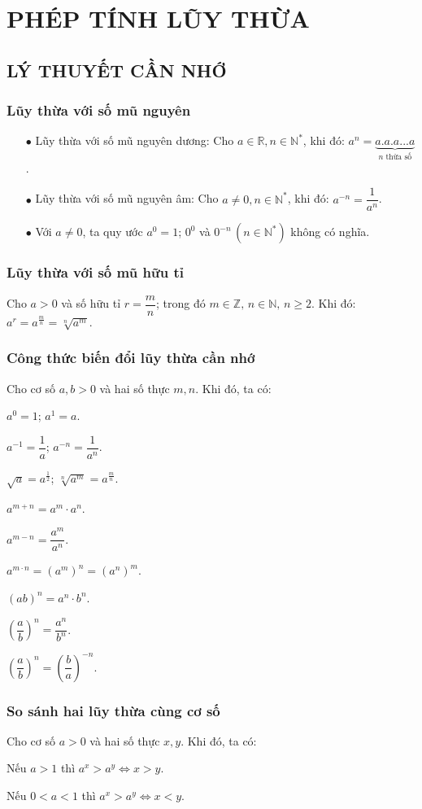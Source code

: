 \section{PHÉP TÍNH LŨY THỪA}
\subsection{LÝ THUYẾT CẦN NHỚ}
\subsubsection{Lũy thừa với số mũ nguyên}
	\begin{itemize}
		\item [$\bullet$] Lũy thừa với số mũ nguyên dương: Cho $a\in \mathbb{R}, n\in {\mathbb{N}}^{*}$, khi đó: $a^n=\underbrace{a.a.a...a}_{n \text{ thừa số}}$.
		\item [$\bullet$] Lũy thừa với số mũ nguyên âm: Cho $a \ne 0, n\in {\mathbb{N}}^{*}$, khi đó: $a^{-n}=\dfrac{1}{a^n}$.
		\item [$\bullet$] Với $a \ne 0$, ta quy ước $a^0=1$; \quad $0^0$ và $0^{-n}\, (n \in \mathbb{N}^{*})$ không có nghĩa.
	\end{itemize}

\subsubsection{Lũy thừa với số mũ hữu tỉ}
	Cho $a>0$ và số hữu tỉ $r=\dfrac{m}{n}$; trong đó $m\in \mathbb{Z},\,n\in \mathbb{N},\,n\ge 2$. Khi đó: $a^r={a}^{\tfrac{m}{n}}=\sqrt[n]{a^m}.$
\subsubsection{Công thức biến đổi lũy thừa cần nhớ}
	Cho cơ số $a,b>0$ và hai số thực $m,n$. Khi đó, ta có:
	\begin{tcolorbox}[colframe=cyan,colback=cyan!4,boxrule=0.2mm]
		\begin{listEX}[3]
			\item [\ding{172}] $a^0=1$; $a^1=a$.
			\item [\ding{173}] $a^{-1}=\dfrac{1}{a}$; $a^{-n}=\dfrac{1}{a^n}$.
			\item [\ding{174}] $\sqrt{a}=a^{\tfrac{1}{2}}$; $\sqrt[n]{a^m}={a}^{\tfrac{m}{n}}$.
			\item [\ding{175}] $a^{m+n}=a^m\cdot a^n$.
			\item [\ding{176}] $a^{m-n}=\dfrac{a^m}{a^n}$.
			\item [\ding{177}] $a^{m\cdot n}=\left(a^m\right)^n=\left(a^n\right)^m$.
			\item [\ding{178}] $(ab)^n=a^n \cdot b^n$.
			\item [\ding{179}] $\left(\dfrac{a}{b}\right)^n=\dfrac{a^n}{b^n}$.
			\item [\ding{180}]  $\left(\dfrac{a}{b}\right)^n=\left(\dfrac{b}{a}\right)^{-n}$.
		\end{listEX}
	\end{tcolorbox}
\subsubsection{So sánh hai lũy thừa cùng cơ số}
Cho cơ số $a>0$ và hai số thực $x,y$. Khi đó, ta có:
\begin{listEX}[2]
	\item [\ding{172}] Nếu $a>1$ thì $a^x>a^y\Leftrightarrow x>y$.
	\item [\ding{173}] Nếu $0<a<1$ thì $a^x>a^y\Leftrightarrow x<y$.
\end{listEX}
